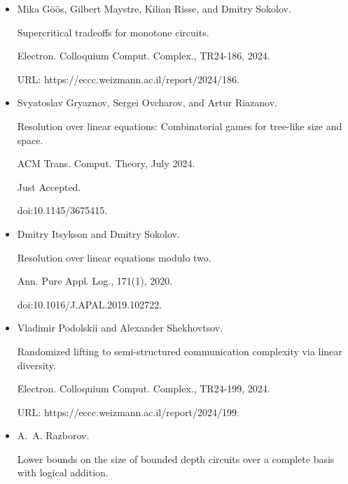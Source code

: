 \begin{itemize}
doi:10.1109/SFCS.1981.35.





\item 
[17]

Mika Göös, Gilbert Maystre, Kilian Risse, and Dmitry Sokolov.


Supercritical tradeoffs for monotone circuits.


Electron. Colloquium Comput. Complex., TR24-186, 2024.


URL: https://eccc.weizmann.ac.il/report/2024/186.





\item 
[18]

Svyatoslav Gryaznov, Sergei Ovcharov, and Artur Riazanov.


Resolution over linear equations: Combinatorial games for tree-like
size and space.


ACM Trans. Comput. Theory, July 2024.


Just Accepted.


doi:10.1145/3675415.





\item 
[19]

Dmitry Itsykson and Dmitry Sokolov.


Resolution over linear equations modulo two.


Ann. Pure Appl. Log., 171(1), 2020.


doi:10.1016/J.APAL.2019.102722.





\item 
[20]

Vladimir Podolskii and Alexander Shekhovtsov.


Randomized lifting to semi-structured communication complexity via
linear diversity.


Electron. Colloquium Comput. Complex., TR24-199, 2024.


URL: https://eccc.weizmann.ac.il/report/2024/199.





\item 
[21]

A. A. Razborov.


Lower bounds on the size of bounded depth circuits over a complete
basis with logical addition.



\end{itemize}
